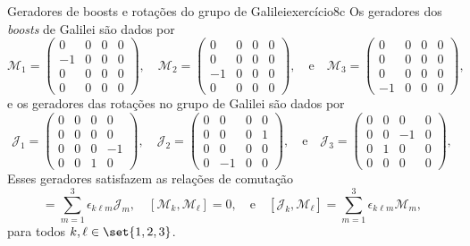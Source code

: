 \begin{proposition}{Geradores de boosts e rotações do grupo de Galilei}{exercício8c}
    Os geradores dos \emph{boosts} de Galilei são dados por
    \begin{equation*}
        \mathcal{M}_1 = \begin{pmatrix}
            0 & 0 & 0 & 0\\
            -1 & 0 & 0 & 0\\
            0 & 0 & 0 & 0\\
            0 & 0 & 0 & 0
        \end{pmatrix},\quad
        \mathcal{M}_2 = \begin{pmatrix}
            0 & 0 & 0 & 0\\
            0 & 0 & 0 & 0\\
            -1 & 0 & 0 & 0\\
            0 & 0 & 0 & 0
        \end{pmatrix},\quad\text{e}\quad
        \mathcal{M}_3 = \begin{pmatrix}
            0 & 0 & 0 & 0\\
            0 & 0 & 0 & 0\\
            0 & 0 & 0 & 0\\
            -1 & 0 & 0 & 0
        \end{pmatrix},
    \end{equation*}
    e os geradores das rotações no grupo de Galilei são dados por
    \begin{equation*}
        \mathcal{J}_1 = \begin{pmatrix}
            0 & 0 & 0 & 0\\
            0 & 0 & 0 & 0\\
            0 & 0 & 0 & -1\\
            0 & 0 & 1 & 0
        \end{pmatrix},\quad
        \mathcal{J}_2 = \begin{pmatrix}
            0 & 0 & 0 & 0\\
            0 & 0 & 0 & 1\\
            0 & 0 & 0 & 0\\
            0 & -1 & 0 & 0
        \end{pmatrix},\quad\text{e}\quad
        \mathcal{J}_3 = \begin{pmatrix}
            0 & 0 & 0 & 0\\
            0 & 0 & -1 & 0\\
            0 & 1 & 0 & 0\\
            0 & 0 & 0 & 0
        \end{pmatrix},
    \end{equation*}
    Esses geradores satisfazem as relações de comutação
    \begin{equation*}
        [\mathcal{J}_k, \mathcal{J}_\ell] = \sum_{m=1}^3 \epsilon_{k \ell m}\mathcal{J}_m,\quad
        [\mathcal{M}_k, \mathcal{M}_\ell] = 0,\quad\text{e}\quad
        [\mathcal{J}_k, \mathcal{M}_\ell] = \sum_{m=1}^3 \epsilon_{k \ell m}\mathcal{M}_m,
    \end{equation*}
    para todos \(k, \ell \in \set{1,2,3}\).
\end{proposition}
